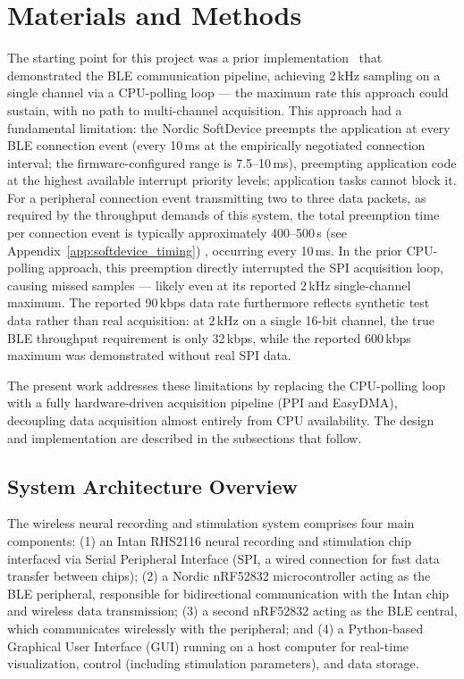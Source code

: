 \section{Materials and Methods}
\label{sec:methods}

The starting point for this project was a prior implementation~\cite{prior_impl} that
demonstrated the BLE communication pipeline, achieving 2\,kHz sampling on a single channel
via a CPU-polling loop --- the maximum rate this approach could sustain, with no path to
multi-channel acquisition. This approach had a fundamental limitation: the Nordic SoftDevice
preempts the application at every BLE connection event (every 10\,ms at the
empirically negotiated connection interval; the firmware-configured range is
7.5--10\,ms), preempting application code at the highest available interrupt priority levels; application
tasks cannot block it. For a peripheral connection event transmitting two to
three data packets, as required by the throughput demands of this system, the total
preemption time per connection event is typically approximately 400--500\,\textmu{}s (see
Appendix~\ref{app:softdevice_timing}) \cite[Table~36]{nordic_s132_sds_v72},
occurring every 10\,ms. In the prior
CPU-polling approach, this preemption directly interrupted the SPI acquisition loop,
causing missed samples --- likely even at its reported 2\,kHz single-channel maximum. The reported 90\,kbps data rate furthermore reflects synthetic
test data rather than real acquisition: at 2\,kHz on a single 16-bit channel, the true
BLE throughput requirement is only 32\,kbps, while the reported 600\,kbps maximum was
demonstrated without real SPI data.

The present work addresses these limitations by replacing the CPU-polling loop with a
fully hardware-driven acquisition pipeline (PPI and EasyDMA), decoupling data acquisition
almost entirely from CPU availability. The design and implementation are described in
the subsections that follow.

\subsection{System Architecture Overview}

The wireless neural recording and stimulation system comprises four main components: (1) an Intan RHS2116 neural recording and stimulation chip interfaced via Serial Peripheral Interface (SPI, a wired connection for fast data transfer between chips); (2) a Nordic nRF52832 microcontroller acting as the BLE peripheral, responsible for bidirectional communication with the Intan chip and wireless data transmission; (3) a second nRF52832 acting as the BLE central, which communicates wirelessly with the peripheral; and (4) a Python-based Graphical User Interface (GUI) running on a host computer for real-time visualization, control (including stimulation parameters), and data storage. 

